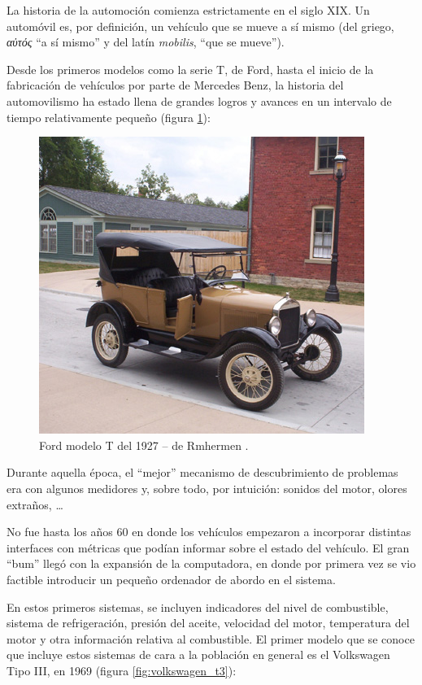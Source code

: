 La historia de la automoción comienza estrictamente en el siglo XIX.
Un automóvil es, por definición, un vehículo que se mueve a sí mismo
(del griego, \textit{αὐτός} ``a sí mismo'' y del latín \textit{mobilis},
``que se mueve'').

Desde los primeros modelos como la serie T, de Ford, hasta el inicio de
la fabricación de vehículos por parte de Mercedes Benz, la historia del
automovilismo ha estado llena de grandes logros y avances en un intervalo
de tiempo relativamente pequeño (figura \ref{fig:ford_model_t}):

\begin{figure}[H]
  \centering
  \includegraphics[width=.8\linewidth]{images/Late_model_Ford_Model_T.jpg}
  \caption{Ford modelo T del 1927 -- de Rmhermen \cite{Ford2022}.}
  \label{fig:ford_model_t}
\end{figure}

Durante aquella época, el ``mejor'' mecanismo de descubrimiento de
problemas era con algunos medidores y, sobre todo, por intuición:
sonidos del motor, olores extraños, \dots

No fue hasta los años 60 en donde los vehículos empezaron a incorporar
distintas interfaces con métricas que podían informar sobre el estado del
vehículo. El gran ``bum'' llegó con la expansión de la computadora, en donde
por primera vez se vio factible introducir un pequeño ordenador de 
abordo en el sistema.

En estos primeros sistemas, se incluyen indicadores del nivel de combustible,
sistema de refrigeración, presión del aceite, velocidad del motor,
temperatura del motor y otra información relativa al combustible. El
primer modelo que se conoce que incluye estos sistemas de cara a la
población en general es el Volkswagen Tipo III, en 1969 (figura \ref{fig:volkswagen_t3}):

